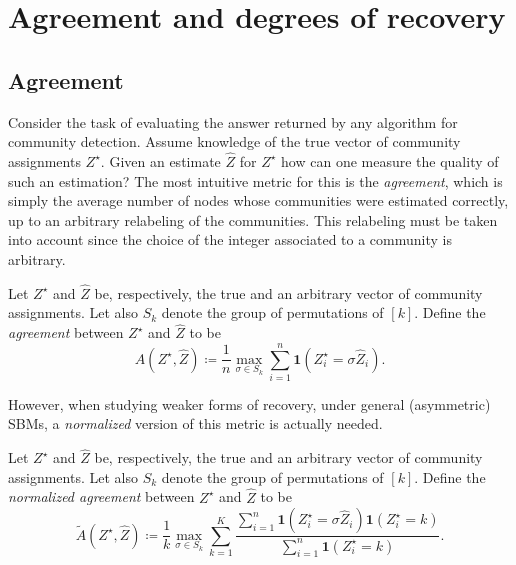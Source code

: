 \documentclass[../../main.tex]{subfiles} %
\begin{document}
\section{Agreement and degrees of recovery}

\subsection{Agreement}

Consider the task of evaluating the answer returned by any algorithm for 
community detection. Assume knowledge of the true vector of community 
assignments \(Z^\star\). Given an estimate \(\hat Z\) for \(Z^\star\) how can 
one measure the quality of such an estimation? The most intuitive metric for 
this is the \textit{agreement}, which is simply the average number of nodes 
whose communities were estimated correctly, up to an arbitrary relabeling of 
the communities. This relabeling must be taken into account since the choice of 
the integer associated to a community is arbitrary.

\begin{definition}[Agreement] \label{def:agreement}
	Let \(Z^\star\) and \(\hat Z\) be, respectively, the true and an 
	arbitrary vector of community assignments. Let also \(S_k\) denote the 
	group of permutations of \([k]\). Define the \textit{agreement} between 
	\(Z^\star\) and \(\hat Z\) to be
	\begin{equation} \label{eq:def-agreement}
		A(Z^\star, \hat Z) \coloneqq \frac{1}{n} \max_{\sigma \in S_k} 
		\sum_{i=1}^n \mathbf{1}(Z^\star_i = \sigma \hat Z_i).
	\end{equation}
\end{definition}

However, when studying weaker forms of recovery, under general (asymmetric) 
SBMs, a \textit{normalized} version of this metric is actually needed.

\begin{definition} \label{def:normalized-agreement}
	Let \(Z^\star\) and \(\hat Z\) be, respectively, the true and an 
	arbitrary vector of community assignments. Let also \(S_k\) denote the 
	group of permutations of \([k]\). Define the \textit{normalized agreement} 
	between \(Z^\star\) and \(\hat Z\) to be
	\begin{equation} \label{eq:def-normalized-agreement}
		\tilde A (Z^\star, \hat Z) \coloneqq 
		\frac{1}{k} \max_{\sigma \in S_k} 
		\sum_{k=1}^K \frac{\sum_{i=1}^n \mathbf{1}(Z^\star_i = \sigma 
			\hat Z_i) \mathbf{1} (Z^\star_i = k)}{\sum_{i=1}^n 
			\mathbf{1} (Z^\star_i = k)}.
	\end{equation}
\end{definition}
\end{document}
